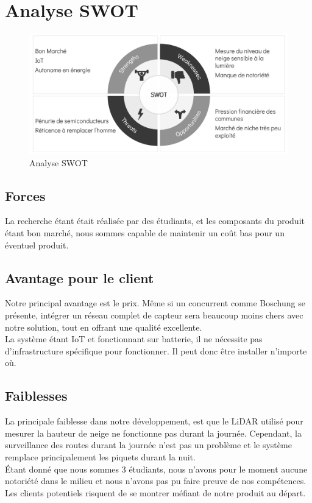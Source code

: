 \section{Analyse SWOT}
\begin{figure}[H]
    \centering
    \includegraphics[width=0.85\linewidth]{Images/business/swot.PNG}
    \caption[]{Analyse SWOT}
    \label{fig:swot}
\end{figure}

\subsection{Forces}
La recherche étant était réalisée par des étudiants, et les composants du produit étant
bon marché, nous sommes capable de maintenir un coût bas pour un éventuel produit.

\subsection{Avantage pour le client}
Notre principal avantage est le prix. Même si un concurrent comme Boschung se présente,
intégrer un réseau complet de capteur sera beaucoup moins chers avec notre
solution, tout en offrant une qualité excellente.\\
La système étant IoT et fonctionnant sur batterie, il ne nécessite pas d'infrastructure
spécifique pour fonctionner. Il peut donc être installer n'importe où.\\

\subsection{Faiblesses}
La principale faiblesse dans notre développement, est que le LiDAR utilisé pour mesurer
la hauteur de neige ne fonctionne pas durant la journée.
Cependant, la surveillance des routes durant la journée n'est pas un problème et le
système remplace principalement les piquets durant la nuit.\\
Étant donné que nous sommes 3 étudiants, nous n'avons pour le moment aucune notoriété dans
le milieu et nous n'avons pas pu faire preuve de nos compétences. Les clients potentiels
risquent de se montrer méfiant de notre produit au départ.

